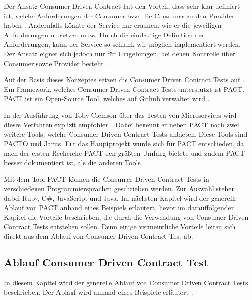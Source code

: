 \documentclass{llncs}
\begin{document}
Der Ansatz Consumer Driven Contract hat den Vorteil, dass sehr klar definiert ist, welche Anforderungen der Consumer bzw. die Consumer an den Provider haben \cite{vitz2016inno}. Andernfalls könnte der Service nur erahnen, wie er die jeweiligen Anforderungen umsetzen muss. Durch die eindeutige Definition der Anforderungen, kann der Service so schlank wie möglich implementiert werden. Der Ansatz eignet sich jedoch nur für Umgebungen, bei denen Kontrolle über Consumer sowie Provider besteht \cite{bayer2015jaxcenter}.

Auf der Basis dieses Konzeptes setzen die Consumer Driven Contract Tests auf \cite{bayer2015jaxcenter, vitz2016inno, Robinson2006}. Ein Framework, welches Consumer Driven Contract Tests unterstützt ist PACT. PACT ist ein Open-Source Tool, welches auf Github verwaltet wird \cite{pact}.

In der Ausführung von Toby Clemson über das Testen von Microservices wird dieses Verfahren explizit empfohlen \cite{Clemson2014}. Dabei benennt er neben PACT noch zwei weitere Tools, welche Consumer Driven Contract Tests anbieten. Diese Tools sind PACTO und Janus. Für das Hauptprojekt wurde sich für PACT entschieden, da nach der ersten Recherche PACT den größten Umfang bietete und zudem PACT besser dokumentiert ist, als die anderen Tools.

Mit dem Tool PACT können die Consumer Driven Contract Tests in verschiedenen Programmiersprachen geschrieben werden. Zur Auswahl stehen dabei Ruby, C\#, JavaScript und Java. Im nächsten Kapitel wird der generelle Ablauf von PACT anhand eines Beispiels erläutert, bevor im darauffolgenden Kapitel die Vorteile beschrieben, die durch die Verwendung von Consumer Driven Contract Tests entstehen sollen. Denn einige vermeintliche Vorteile leiten sich direkt aus dem Ablauf von Consumer Driven Contract Test ab.

\subsection{Ablauf Consumer Driven Contract Test}
In diesem Kapitel wird der generelle Ablauf von Consumer Driven Contract Tests beschrieben. Der Ablauf wird anhand eines Beispiele erläutert \cite{bayer2015jaxcenter, vitz2016inno, Vincent2015}.
\end{document}
